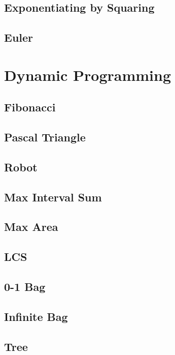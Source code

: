     \subsection{Exponentiating by Squaring}
        
    \subsection{Euler}
        
\section{Dynamic Programming}
    \subsection{Fibonacci}
            
    \subsection{Pascal Triangle}
        
    \subsection{Robot}
        
    \subsection{Max Interval Sum}
        
    \subsection{Max Area}
        
    \subsection{LCS}
        
    \subsection{0-1 Bag}
        
    \subsection{Infinite Bag}
        
    \subsection{Tree}
        